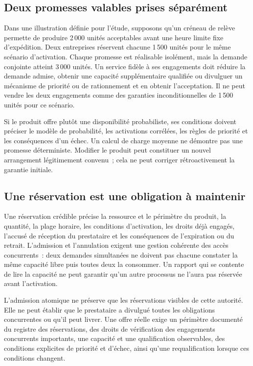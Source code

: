 \documentclass[11pt,a4paper]{article}
\begin{document}
\subsection{Deux promesses valables prises séparément}
Dans une illustration définie pour l’étude, supposons qu’un créneau de relève permette de produire 2\,000 unités acceptables avant une heure limite fixe d’expédition. Deux entreprises réservent chacune 1\,500 unités pour le même scénario d’activation. Chaque promesse est réalisable isolément, mais la demande conjointe atteint 3\,000 unités. Un service fidèle à ses engagements doit réduire la demande admise, obtenir une capacité supplémentaire qualifiée ou divulguer un mécanisme de priorité ou de rationnement et en obtenir l’acceptation. Il ne peut vendre les deux engagements comme des garanties inconditionnelles de 1\,500 unités pour ce scénario.

Si le produit offre plutôt une disponibilité probabiliste, ses conditions doivent préciser le modèle de probabilité, les activations corrélées, les règles de priorité et les conséquences d’un échec. Un calcul de charge moyenne ne démontre pas une promesse déterministe. Modifier le produit peut constituer un nouvel arrangement légitimement convenu~; cela ne peut corriger rétroactivement la garantie initiale.

\subsection{Une réservation est une obligation à maintenir}
Une réservation crédible précise la ressource et le périmètre du produit, la quantité, la plage horaire, les conditions d’activation, les droits déjà engagés, l’accusé de réception du prestataire et les conséquences de l’expiration ou du retrait. L’admission et l’annulation exigent une gestion cohérente des accès concurrents~: deux demandes simultanées ne doivent pas chacune constater la même capacité libre puis toutes deux la consommer. Un rapport qui se contente de lire la capacité ne peut garantir qu’un autre processus ne l’aura pas réservée avant l’activation.

L’admission atomique ne préserve que les réservations visibles de cette autorité. Elle ne peut établir que le prestataire a divulgué toutes les obligations concurrentes ou qu’il peut livrer. Une offre réelle exige un périmètre documenté du registre des réservations, des droits de vérification des engagements concurrents importants, une capacité et une qualification observables, des conditions explicites de priorité et d’échec, ainsi qu’une requalification lorsque ces conditions changent.
\end{document}
